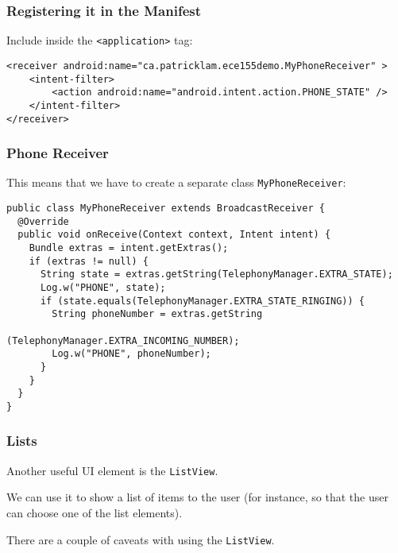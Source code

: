 \begin{frame}[fragile]
\frametitle{Registering it in the Manifest}
\begin{changemargin}{1cm}

Include inside the \verb+<application>+ tag:
{\scriptsize
\begin{verbatim}
<receiver android:name="ca.patricklam.ece155demo.MyPhoneReceiver" >
    <intent-filter>
        <action android:name="android.intent.action.PHONE_STATE" />
    </intent-filter>
</receiver>
\end{verbatim}
}
\end{changemargin}
\end{frame}

\begin{frame}[fragile]
\frametitle{Phone Receiver}
\begin{changemargin}{1cm}
This means that we have to create a separate class {\tt MyPhoneReceiver}:
{\scriptsize
\begin{verbatim}
public class MyPhoneReceiver extends BroadcastReceiver {
  @Override
  public void onReceive(Context context, Intent intent) {
    Bundle extras = intent.getExtras();
    if (extras != null) {
      String state = extras.getString(TelephonyManager.EXTRA_STATE);
      Log.w("PHONE", state);
      if (state.equals(TelephonyManager.EXTRA_STATE_RINGING)) {
        String phoneNumber = extras.getString
                               (TelephonyManager.EXTRA_INCOMING_NUMBER);
        Log.w("PHONE", phoneNumber);
      }
    }
  }
}
\end{verbatim}

}


\end{changemargin}
\end{frame}

\begin{frame}
\frametitle{Lists}
\begin{changemargin}{1cm}

Another useful UI element is the {\tt ListView}.

We can use it to show 
a list of items to the user (for instance, so that the user can choose
one of the list elements). 

There are a couple of caveats with using the
{\tt ListView}.

\end{changemargin}
\end{frame}

